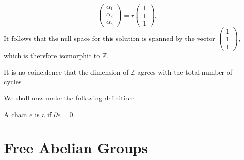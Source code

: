 \documentclass[notoc,notitlepage]{tufte-book}
\begin{document}
\begin{eg}
  \begin{equation*}
    \begin{pmatrix}
      \alpha_1 \\ \alpha_2 \\ \alpha_3
    \end{pmatrix} = 
    r \begin{pmatrix}
      1 \\ 1 \\ 1
    \end{pmatrix}.
  \end{equation*}
  It follows that the null space for this solution is spanned by the vector
  $\left( \begin{smallmatrix} 1 \\ 1 \\ 1 \end{smallmatrix} \right)$, which is
  therefore isomorphic to $\mathbb{Z}$.
\end{eg}

\begin{remark}
  It is no coincidence that the dimension of $\mathbb{Z}$ agrees with the total
  number of cycles.
\end{remark}

We shall now make the following definition:

\begin{defn}[Cycle]\label{defn:cycle}
  A chain $e$ is a  if $\partial e = 0$.
\end{defn}



\appendix

\chapter{Free Abelian Groups}%
\label{chp:free_abelian_groups}
\end{document}
